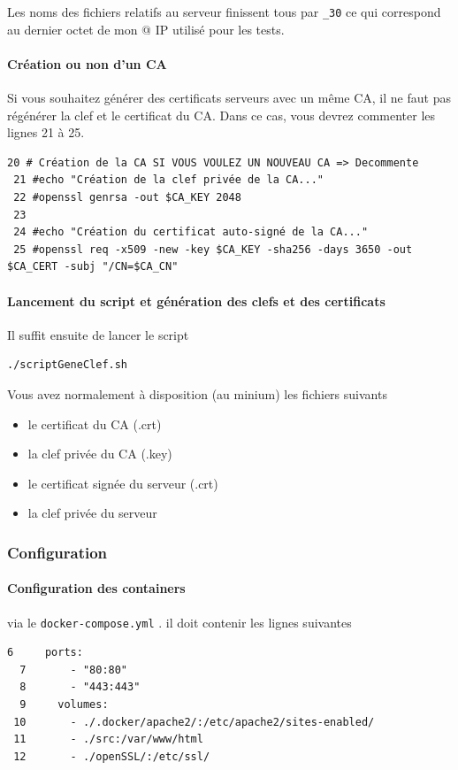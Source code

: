 \documentclass[french, 12pt]{article}%
\newcommand{\itemE}{\item[$\bullet$]}
\begin{document}
Les noms des fichiers relatifs au serveur finissent tous par \verb?_30? ce qui correspond au dernier octet de mon @ IP utilisé pour les tests.


\paragraph{Création ou non d'un CA}
Si vous souhaitez générer des certificats serveurs avec un même CA, il ne faut pas régénérer la clef et le certificat du CA. Dans ce cas, vous devrez commenter les lignes 21 à 25.

\begin{lstlisting}[style=commande]
 20 # Création de la CA SI VOUS VOULEZ UN NOUVEAU CA => Decommente
 21 #echo "Création de la clef privée de la CA..."
 22 #openssl genrsa -out $CA_KEY 2048
 23 
 24 #echo "Création du certificat auto-signé de la CA..."
 25 #openssl req -x509 -new -key $CA_KEY -sha256 -days 3650 -out $CA_CERT -subj "/CN=$CA_CN"

\end{lstlisting}


\paragraph{Lancement du script et génération des clefs et des certificats}
Il suffit ensuite de lancer le script

\begin{lstlisting}[style=commande]
./scriptGeneClef.sh 
\end{lstlisting}
Vous avez normalement à disposition (au minium) les fichiers suivants 
\begin{itemize}
\itemE le certificat du CA (.crt)
\itemE la clef privée du CA (.key)
\itemE le certificat signée du serveur (.crt)
\itemE la clef privée du serveur
\end{itemize}

\subsubsection{Configuration }


\paragraph{Configuration des containers} via le  \verb?docker-compose.yml? . il doit contenir les lignes suivantes 

\begin{lstlisting}[style=commande]
  6     ports:
  7       - "80:80"
  8       - "443:443"
  9     volumes:
 10       - ./.docker/apache2/:/etc/apache2/sites-enabled/
 11       - ./src:/var/www/html
 12       - ./openSSL/:/etc/ssl/
\end{lstlisting}
\end{document}
